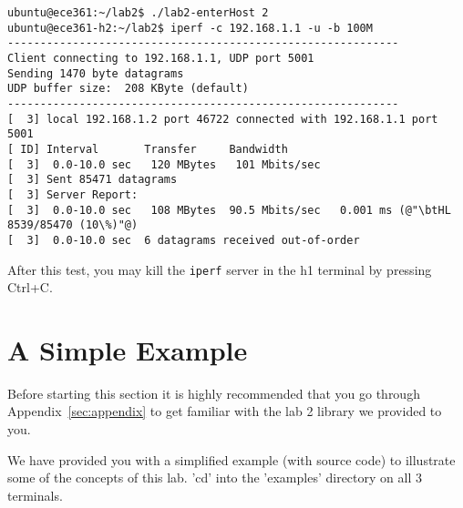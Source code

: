 \documentclass[11pt]{article}
\begin{document}
\begin{lstlisting}[style=ece361shell, caption={Running an \texttt{iperf} client in h2.}, label={lst:iperf-client}]
ubuntu@ece361:~/lab2$ ./lab2-enterHost 2
ubuntu@ece361-h2:~/lab2$ iperf -c 192.168.1.1 -u -b 100M
------------------------------------------------------------
Client connecting to 192.168.1.1, UDP port 5001
Sending 1470 byte datagrams
UDP buffer size:  208 KByte (default)
------------------------------------------------------------
[  3] local 192.168.1.2 port 46722 connected with 192.168.1.1 port 5001
[ ID] Interval       Transfer     Bandwidth
[  3]  0.0-10.0 sec   120 MBytes   101 Mbits/sec
[  3] Sent 85471 datagrams
[  3] Server Report:
[  3]  0.0-10.0 sec   108 MBytes  90.5 Mbits/sec   0.001 ms (@"\btHL 8539/85470 (10\%)"@)
[  3]  0.0-10.0 sec  6 datagrams received out-of-order
\end{lstlisting}

After this test, you may kill the \texttt{iperf} server in the h1 terminal by pressing Ctrl+C.


%
%

\section{A Simple Example}
\label{sec:example}
Before starting this section it is highly recommended that you go through Appendix~\ref{sec:appendix} to get familiar with the lab 2 library we provided to you.

We have provided you with a simplified example (with source code) to illustrate some of the concepts of this lab. 'cd' into the 'examples' directory on all 3 terminals.
\end{document}
